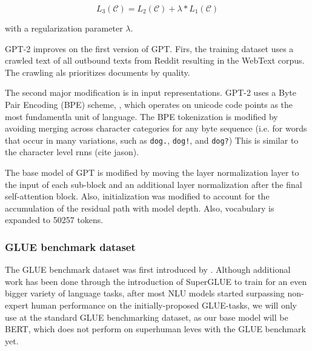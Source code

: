 \documentclass[a4paper,12pt,twoside,openright]{report}
\begin{document}
\begin{equation}
L_{3}(\mathcal{C})=L_{2}(\mathcal{C})+\lambda * L_{1}(\mathcal{C})
\end{equation}

with a regularization parameter $\lambda$.



GPT-2 improves on the first version of GPT.
Firs, the training dataset uses a crawled text of all outbound texts from Reddit resulting in the WebText corpus. 
The crawling als prioritizes documents by quality.

The second major modification is in input representations.
GPT-2 uses a Byte Pair Encoding (BPE) scheme,
\cite{sennrich15}, which operates on unicode code points as the most fundamentla unit of language.
The BPE tokenization is modified by avoiding merging across character categories for any byte sequence (i.e. for words that occur in many variations, such as \Verb#dog.#, \Verb#dog!#, and \Verb#dog?#)
This is similar to the character level rnns (cite jason).

The base model of GPT is modified by moving the layer normalization \cite{ba16} layer to the input of each sub-block and an additional layer normalization after the final self-attention block. 
Also, initialization was modified to account for the accumulation of the residual path with model depth.
Also, vocabulary is expanded to 50257 tokens.

\subsubsection{GLUE benchmark dataset}

The GLUE benchmark dataset was first introduced by \cite{wang19}.
Although additional work has been done through the introduction of SuperGLUE \cite{wang19b} to train for an even bigger variety of language tasks, after most NLU models started surpassing non-expert human performance on the initially-proposed GLUE-tasks, we will only use at the standard GLUE benchmarking dataset, as our base model will be BERT, which does not perform on superhuman leves with the GLUE benchmark yet.
\end{document}
